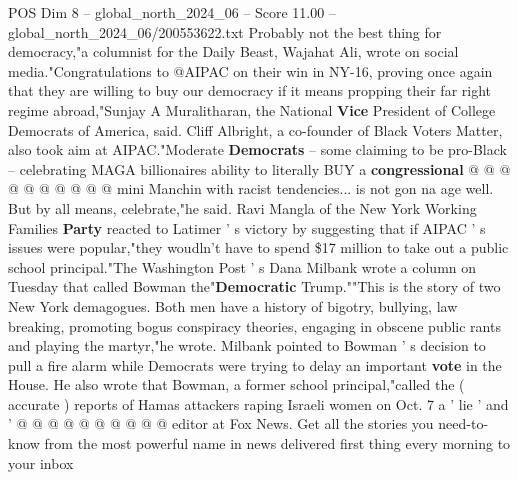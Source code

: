 \begin{textsample}{POS Dim 8 – global\_north\_2024\_06 – Score 11.00 – global\_north\_2024\_06/200553622.txt}
Probably not the best thing for democracy,"a columnist for the Daily Beast, Wajahat Ali, wrote on social media."Congratulations to @AIPAC on their win in NY-16, proving once again that they are willing to buy our democracy if it means propping their far right regime abroad,"Sunjay A Muralitharan, the National \textbf{Vice} President of College Democrats of America, said.
Cliff Albright, a co-founder of Black Voters Matter, also took aim at AIPAC."Moderate \textbf{Democrats} -- some claiming to be pro-Black -- celebrating MAGA billionaires ability to literally BUY a \textbf{congressional} @ @ @ @ @ @ @ @ @ @ mini Manchin with racist tendencies... is not gon na age well.
But by all means, celebrate,"he said.
Ravi Mangla of the New York Working Families \textbf{Party} reacted to Latimer ' s victory by suggesting that if AIPAC ' s issues were popular,"they woudln't have to spend \$17 million to take out a public school principal."The Washington Post ' s Dana Milbank wrote a column on Tuesday that called Bowman the"\textbf{Democratic} Trump.""This is the story of two New York demagogues.
Both men have a history of bigotry, bullying, law breaking, promoting bogus conspiracy theories, engaging in obscene public rants and playing the martyr,"he wrote.
Milbank pointed to Bowman ' s decision to pull a fire alarm while Democrats were trying to delay an important \textbf{vote} in the House.
He also wrote that Bowman, a former school principal,"called the ( accurate ) reports of Hamas attackers raping Israeli women on Oct. 7 a ' lie ' and ' @ @ @ @ @ @ @ @ @ @ editor at Fox News.
Get all the stories you need-to-know from the most powerful name in news delivered first thing every morning to your inbox

\end{textsample}
